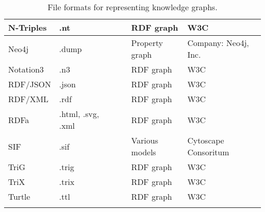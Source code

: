 \documentclass{article}
\begin{document}
\begin{landscape}
\begin{xltabular}{\textwidth}{p{3cm}|p{3cm}|p{2.2cm}|p{2.2cm}|p{2.2cm}|p{6cm}}
\hline


N-Triples
&
.nt
&
\cite{ntriples_wiki}
&
\cite{ntriples_spec}
&
RDF graph
&
W3C
\cite{w3c_group}
\\


\hline


Neo4j
&
.dump
&
\cite{neo4j_wiki}
&
\cite{neo4j_spec}
&
Property graph
&
Company: Neo4j, Inc.
\cite{neo4j_group}
\\


\hline


Notation3
&
.n3
&
\cite{notation3_wiki}
&
\cite{notation3_spec}
&
RDF graph
&
W3C
\cite{w3c_group}
\\


\hline


RDF/JSON
&
.json
&
\cite{rdfjson_website}
&
\cite{rdfjson_spec}
&
RDF graph
&
W3C
\cite{w3c_group}
\\


\hline


RDF/XML
&
.rdf
&
\cite{rdfxml_wiki}
&
\cite{rdfxml_spec}
&
RDF graph
&
W3C
\cite{w3c_group}
\\


\hline


RDFa
&
.html, .svg, .xml
&
\cite{rdfa_wiki}
&
\cite{rdfa_spec}
&
RDF graph
&
W3C
\cite{w3c_group}
\\


\hline


SIF
&
.sif
&
\cite{sif_website}
&
\cite{sif_spec}
&
Various models
&
Cytoscape Consoritum
\cite{sif_group}
\\


\hline


TriG
&
.trig
&
\cite{trig_wiki}
&
\cite{trig_spec}
&
RDF graph
&
W3C
\cite{w3c_group}
\\


\hline


TriX
&
.trix
&
\cite{trix_wiki}
&
\cite{trix_spec}
&
RDF graph
&
W3C
\cite{w3c_group}
\\


\hline


Turtle
&
.ttl
&
\cite{turtle_wiki}
&
\cite{turtle_spec}
&
RDF graph
&
W3C
\cite{w3c_group}
\\


\caption{File formats for representing knowledge graphs.}
\label{table:file_formats}
\end{xltabular}

\end{landscape}
\end{document}
